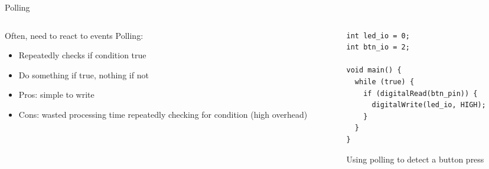 \documentclass{beamer}
\begin{document}
\begin{frame}[fragile]{Polling}
  \begin{columns}[T]
    \begin{column}{.6\textwidth}
      Often, need to react to events \newline
      \newline
      Polling:
      \begin{itemize}
        \item Repeatedly checks if condition true
        \item Do something if true, nothing if not
        \item Pros: simple to write
        \item Cons: wasted processing time repeatedly checking for condition (high overhead)
      \end{itemize}
    \end{column}

    \begin{column}{0.4\textwidth}
\begin{lstlisting}[tabsize=2,basicstyle=\ttfamily\scriptsize]
int led_io = 0;
int btn_io = 2;
  
void main() {
  while (true) {
    if (digitalRead(btn_pin)) {
      digitalWrite(led_io, HIGH);
    }
  }
} \end{lstlisting} 
Using polling to detect a button press
    \end{column}
  \end{columns}
\end{frame}
\end{document}
